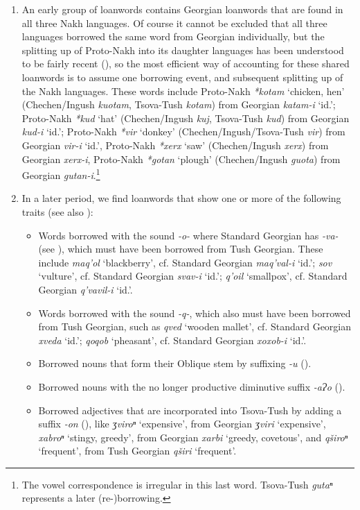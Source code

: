 \begin{enumerate}
	
	\item An early group of loanwords contains Georgian loanwords that are found in all three Nakh languages. Of course it cannot be excluded that all three languages borrowed the same word from Georgian individually, but the splitting up of Proto-Nakh into its daughter languages has been understood to be fairly recent (\cite[1]{nichols03cc}), so the most efficient way of accounting for these shared loanwords is to assume one borrowing event, and subsequent splitting up of the Nakh languages. These words include Proto-Nakh \textit{*kotam} `chicken, hen' (Chechen/Ingush \textit{kuotam}, Tsova-Tush \textit{kotam}) from Georgian \textit{katam-i} `id.'; Proto-Nakh \textit{*kud} `hat' (Chechen/Ingush \textit{kuj}, Tsova-Tush \textit{kud}) from Georgian \textit{kud-i} `id.'; Proto-Nakh \textit{*vir} `donkey' (Chechen/Ingush/Tsova-Tush \textit{vir}) from Georgian \textit{vir-i} `id.', Proto-Nakh \textit{*xerx} `saw' (Chechen/Ingush \textit{xerx}) from Georgian \textit{xerx-i}, Proto-Nakh \textit{*gotan} `plough' (Chechen/Ingush \textit{guota}) from Georgian \textit{gutan-i}.\footnote{The vowel correspondence is irregular in this last word. Tsova-Tush \textit{gutaⁿ} represents a later (re-)borrowing.}
	
	\item In a later period, we find loanwords that show one or more of the following traits (see also \cite{faehnrich1998loanwords}):
	\begin{itemize}
		\item Words borrowed with the sound \textit{-o-} where Standard Georgian has \textit{-va-} (see ), which must have been borrowed from Tush Georgian. These include \textit{maq'ol} `blackberry', cf. Standard Georgian \textit{maq'val-i} `id.'; \textit{sov} `vulture', cf. Standard Georgian \textit{svav-i} `id.'; \textit{q'oil} `smallpox', cf. Standard Georgian \textit{q'vavil-i} `id.'.
		\item Words borrowed with the sound \textit{-q-}, which also must have been borrowed from Tush Georgian, such as \textit{qved} `wooden mallet', cf. Standard Georgian \textit{xveda} `id.'; \textit{qoqob} `pheasant', cf. Standard Georgian \textit{xoxob-i} `id.'.
		\item Borrowed nouns that form their Oblique stem by suffixing \textit{-u} ().
		\item Borrowed nouns with the no longer productive diminutive suffix \textit{-aɁo} ().
		\item Borrowed adjectives that are incorporated into Tsova-Tush by adding a suffix \textit{-on} (), like \textit{ʒviroⁿ} `expensive', from Georgian \textit{ʒviri} `expensive', \textit{xabroⁿ} `stingy, greedy', from Georgian \textit{xarbi} `greedy, covetous', and \textit{qširoⁿ} `frequent', from Tush Georgian \textit{qširi} `frequent'.
	\end{itemize}
	

\end{enumerate}
